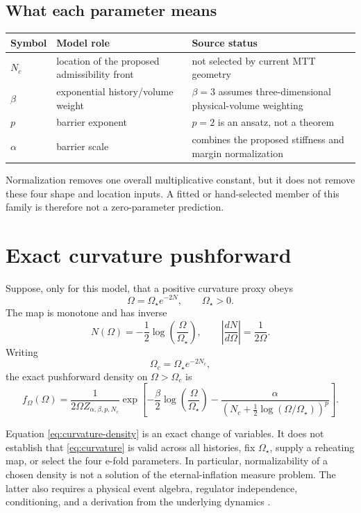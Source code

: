 \documentclass[11pt]{article}
\begin{document}
\subsection{What each parameter means}

\begin{center}
\begin{tabular}{p{}p{}p{}}
\toprule
Symbol & Model role & Source status\\
\midrule
\(N_c\) & location of the proposed admissibility front
& not selected by current MTT geometry\\
\(\beta\) & exponential history/volume weight
& \(\beta=3\) assumes three-dimensional physical-volume weighting\\
\(p\) & barrier exponent
& \(p=2\) is an ansatz, not a theorem\\
\(\alpha\) & barrier scale
& combines the proposed stiffness and margin normalization\\
\bottomrule
\end{tabular}
\end{center}

Normalization removes one overall multiplicative constant, but it does not
remove these four shape and location inputs. A fitted or hand-selected member
of this family is therefore not a zero-parameter prediction.

\section{Exact curvature pushforward}

Suppose, only for this model, that a positive curvature proxy obeys
\begin{equation}
\Omega=\Omega_\star e^{-2N},
\qquad \Omega_\star>0.
\label{eq:curvature}
\end{equation}
The map is monotone and has inverse
\[
N(\Omega)=-\frac12\log\left(\frac{\Omega}{\Omega_\star}\right),
\qquad
\left|\frac{dN}{d\Omega}\right|=\frac{1}{2\Omega}.
\]
Writing
\[
\Omega_c=\Omega_\star e^{-2N_c},
\]
the exact pushforward density on \(\Omega>\Omega_c\) is
\begin{equation}
f_\Omega(\Omega)
=
\frac{1}{2\Omega Z_{\alpha,\beta,p,N_c}}
\exp\left[
-\frac{\beta}{2}\log\left(\frac{\Omega}{\Omega_\star}\right)
-\frac{\alpha}{
\left(
N_c+\frac12\log(\Omega/\Omega_\star)
\right)^p}
\right].
\label{eq:curvature-density}
\end{equation}

Equation \eqref{eq:curvature-density} is an exact change of variables. It does
not establish that \eqref{eq:curvature} is valid across all histories, fix
\(\Omega_\star\), supply a reheating map, or select the four e-fold parameters.
In particular, normalizability of a chosen density is not a solution of the
eternal-inflation measure problem. The latter also requires a physical event
algebra, regulator independence, conditioning, and a derivation from the
underlying dynamics \cite{Freivogel2011}.
\end{document}
